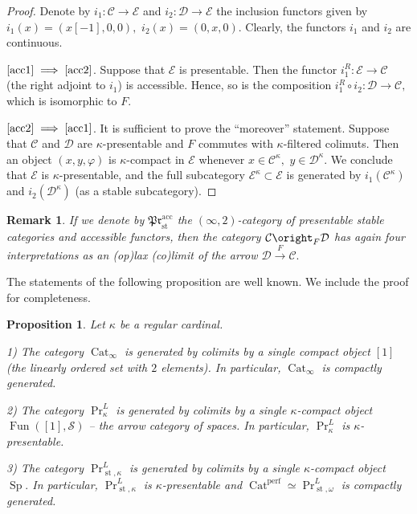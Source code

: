 \documentclass[11pt,leqno]{amsart}
\newcommand{\Implies}[2]{$\text{\ref{#1}}\implies\text{\ref{#2}}$}
\newtheorem{prop}[theo]{Proposition}
\newtheorem{remark}[theo]{Remark}
\numberwithin{equation}{section}
\newcommand{\xto}{\xrightarrow}
\newcommand{\Cat}{\operatorname{Cat}}
\newcommand{\acc}{\operatorname{acc}}
\newcommand{\st}{\operatorname{st}}
\newcommand{\cD}{{\mathcal D}}
\newcommand{\cC}{{\mathcal C}}
\newcommand{\cE}{{\mathcal E}}
\newcommand{\cS}{{\mathcal S}}
\newcommand{\Fun}{\operatorname{Fun}}
\newcommand{\perf}{\operatorname{perf}}
\newcommand{\Sp}{\operatorname{Sp}}
\newcommand{\mPr}{\mathfrak{Pr}}
\begin{document}
\begin{proof}Denote by $i_1:\cC\to\cE$ and $i_2:\cD\to\cE$ the inclusion functors given by $i_1(x)=(x[-1],0,0),$ $i_2(x)=(0,x,0).$ Clearly, the functors $i_1$ and $i_2$ are continuous.

\Implies{acc1}{acc2}. Suppose that $\cE$ is presentable. Then the functor $i_1^R:\cE\to\cC$ (the right adjoint to $i_1$) is accessible. Hence, so is the composition $i_1^R\circ i_2:\cD\to\cC,$ which is isomorphic to $F.$ 

\Implies{acc2}{acc1}. It is sufficient to prove the ``moreover'' statement. Suppose that $\cC$ and $\cD$ are $\kappa$-presentable and $F$ commutes with $\kappa$-filtered colimuts. Then an object $(x,y,\varphi)$ is $\kappa$-compact in $\cE$ whenever $x\in\cC^{\kappa},$ $y\in\cD^{\kappa}.$ We conclude that $\cE$ is $\kappa$-presentable, and the full subcategory $\cE^{\kappa}\subset\cE$ is generated by $i_1(\cC^{\kappa})$ and $i_2(\cD^{\kappa})$ (as a stable subcategory).
\end{proof}

\begin{remark}If we denote by $\mPr^{\acc}_{\st}$ the $(\infty,2)$-category of presentable stable categories and accessible functors, then the category $\cC\oright_F\cD$ has again four interpretations as an (op)lax (co)limit of the arrow $\cD\xto{F}\cC.$\end{remark}

The statements of the following proposition are well known. We include the proof for completeness.

\begin{prop}\label{prop:presentability_of_Pr_kappa} Let $\kappa$ be a regular cardinal.

1) The category $\Cat_{\infty}$ is generated by colimits by a single compact object $[1]$ (the linearly ordered set with $2$ elements). In particular, $\Cat_{\infty}$ is compactly generated.

2) The category $\Pr^L_{\kappa}$ is generated by colimits by a single $\kappa$-compact object $\Fun([1],\cS)$ -- the arrow category of spaces. In particular, $\Pr^L_{\kappa}$ is $\kappa$-presentable. 

3) The category $\Pr^L_{\st,\kappa}$ is generated by colimits by a single $\kappa$-compact object $\Sp.$ In particular, $\Pr^L_{\st,\kappa}$ is $\kappa$-presentable and $\Cat^{\perf}\simeq \Pr^L_{\st,\omega}$ is compactly generated.
\end{prop}
\end{document}
